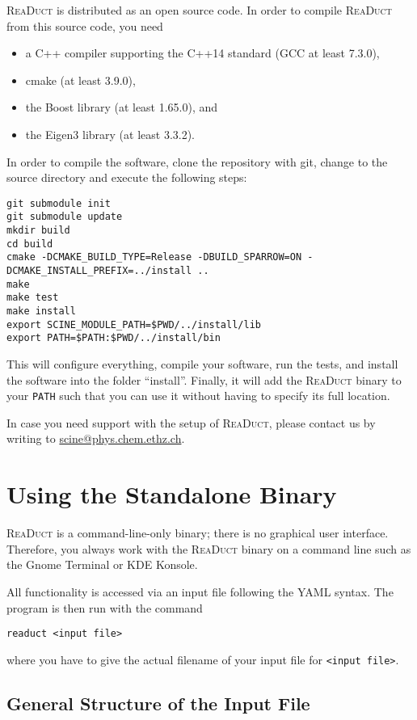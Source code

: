 \documentclass[]{tufte-book}
\begin{document}
\textsc{ReaDuct} is distributed as an open source code. In order to compile \textsc{ReaDuct} from this source code, you need
\begin{itemize}
 \item a C++ compiler supporting the C++14 standard (GCC at least 7.3.0),
 \item cmake (at least 3.9.0),
 \item the Boost library (at least 1.65.0), and
 \item the Eigen3 library (at least 3.3.2).
\end{itemize}
In order to compile the software, clone the repository with git, change
to the source directory and execute the following steps:
\begin{verbatim}
git submodule init
git submodule update
mkdir build
cd build
cmake -DCMAKE_BUILD_TYPE=Release -DBUILD_SPARROW=ON -DCMAKE_INSTALL_PREFIX=../install ..
make
make test
make install
export SCINE_MODULE_PATH=$PWD/../install/lib
export PATH=$PATH:$PWD/../install/bin
\end{verbatim}
This will configure everything, compile your software, run the tests, and install the software
into the folder ``install''. Finally, it will add the \textsc{ReaDuct} binary to your \texttt{PATH} such that you can use
it without having to specify its full location.

In case you need support with the setup of \textsc{ReaDuct}, please contact us by writing to \href{scine@phys.chem.ethz.ch}{scine@phys.chem.ethz.ch}.



\chapter{Using the Standalone Binary}

\textsc{ReaDuct} is a command-line-only binary; there is no graphical user interface. Therefore, you always work with the
\textsc{ReaDuct} binary on a command line such as the Gnome Terminal or KDE Konsole.

All functionality is accessed via an input file following the YAML syntax. The program is then run with the
command

\begin{verbatim}
readuct <input file>
\end{verbatim}

where you have to give the actual filename of your input file for \texttt{<input file>}.


\section{General Structure of the Input File}
\end{document}
